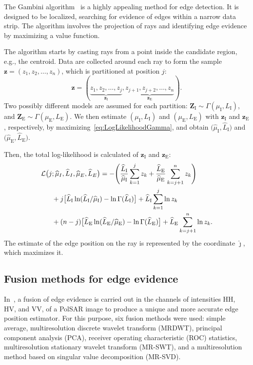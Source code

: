 \documentclass{article}
\begin{document}
The Gambini algorithm~\cite{Gambini2007} is a highly appealing method for edge detection. It is designed to be localized, searching for evidence of edges within a narrow data strip. The algorithm involves the projection of rays and identifying edge evidence by maximizing a value function.

The algorithm starts by casting rays from a point inside the candidate region, e.g., the centroid.
Data are collected around each ray to form the sample $\bm z = (z_1,z_2,\dots,z_n)$, which is partitioned at position $j$:
$$
\bm z = (\underbrace{z_1,z_2,\dots,z_j}_{\bm z_\text{I}}, 
\underbrace{z_{j+1}, z_{j+2},\dots,z_n}_{\bm z_\text{E}}).
$$
Two possibly different models are assumed for each partition:
$\bm Z_\text{I} \sim \Gamma(\mu_\text{I},L_\text{I})$, and 
$\bm Z_\text{E} \sim \Gamma(\mu_\text{E},L_\text{E})$.
We then estimate $(\mu_\text{I},L_\text{I})$ and $(\mu_\text{E},L_\text{E})$ with $\bm z_\text{I}$ and $\bm z_\text{E}$, respectively, by maximizing~\eqref{eq:LogLikelihoodGamma}, and obtain $\big(\widehat{\mu}_\text{I}, \widehat{L}_\text{I}\big)$ and $\big(\widehat{\mu}_\text{E}, \widehat{L}_\text{E}\big)$.

Then, the total log-likelihood is calculated of $\bm z_\text{I}$ and $\bm z_\text{E}$:
\begin{equation}\label{eq:TotalLogLikelihood}
\begin{aligned}
\mathcal L\big(j&;\widehat{\mu}_I, \widehat{L}_I,\widehat{\mu}_E, \widehat{L}_E\big)= -\Bigg(
	\frac{\widehat{L}_\text{I}}{\widehat{\mu}_\text{I}}\sum_{k=1}^{j} z_k +
	\frac{\widehat{L}_\text{E}}{\widehat{\mu}_\text{E}}\sum_{k=j+1}^{n} z_k  
	\Bigg)\mbox{}\\
&+j \big[\widehat{L}_\text{I}\ln (\widehat{L}_\text{I} / \widehat{\mu}_\text{I}) - \ln \Gamma(\widehat{L}_\text{I})\big]
+\widehat{L}_\text{I} \sum_{k=1}^{j}\ln z_k  \mbox{}\\
&+(n-j) \big[\widehat{L}_\text{E}\ln (\widehat{L}_\text{E} / \widehat{\mu}_\text{E}) - \ln \Gamma(\widehat{L}_\text{E})\big]
+\widehat{L}_\text{E} \sum_{k=j+1}^{n}\ln z_k .%
\raisetag{2.2em}
\end{aligned}
\end{equation}
The estimate of the edge position on the ray is represented by the coordinate  $\widehat\jmath$, which maximizes it.

\subsection{Fusion methods for edge evidence}
In~\cite{DeBorba2020}, a fusion of edge evidence is carried out in the channels of intensities HH, HV, and VV, of a PolSAR image to produce a unique and more accurate edge position estimator. For this purpose, six fusion methods were used:  simple average, multiresolution discrete wavelet transform (MRDWT), principal component analysis (PCA), receiver operating characteristic (ROC) statistics, multiresolution stationary wavelet transform (MR-SWT), and a multiresolution method based on singular value decomposition (MR-SVD).\par
\end{document}
